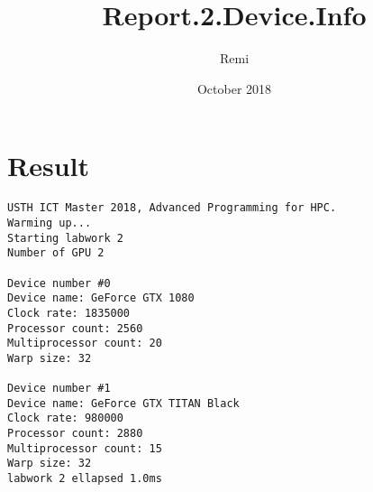 \documentclass{article}
\title{Report.2.Device.Info}
\author{Remi }
\date{October 2018}
\begin{document}
\maketitle

\section{Result}

\begin{verbatim}
USTH ICT Master 2018, Advanced Programming for HPC.
Warming up...
Starting labwork 2
Number of GPU 2

Device number #0
Device name: GeForce GTX 1080
Clock rate: 1835000
Processor count: 2560
Multiprocessor count: 20
Warp size: 32

Device number #1
Device name: GeForce GTX TITAN Black
Clock rate: 980000
Processor count: 2880
Multiprocessor count: 15
Warp size: 32
labwork 2 ellapsed 1.0ms
\end{verbatim}
\end{document}
